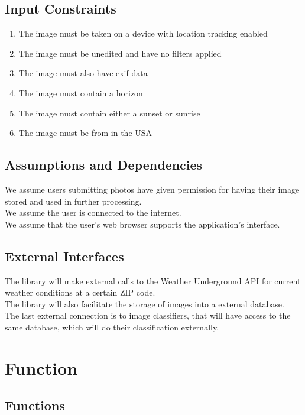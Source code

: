 \documentclass[journal,10pt,draftclsnofoot,onecolumn]{IEEEtran}
\begin{document}
\begin{singlespace}
	\subsection{Input Constraints}
	\begin{enumerate}
		\item The image must be taken on a device with location tracking enabled
		\item The image must be unedited and have no filters applied
		\item The image must also have exif data
		\item The image must contain a horizon
		\item The image must contain either a sunset or sunrise
		\item The image must be from in the USA
	\end{enumerate}

	\subsection{Assumptions and Dependencies}
		We assume users submitting photos have given permission for having their image stored and used in further processing.\\
		We assume the user is connected to the internet.\\
		We assume that the user's web browser supports the application's interface.\\


	\subsection{External Interfaces}
		The library will make external calls to the Weather Underground API for current weather conditions at a certain ZIP code.\\
		The library will also facilitate the storage of images into a external database.\\
		The last external connection is to image classifiers, that will have access to the same database, which will do their classification externally.

\clearpage

\section{Function}
	\subsection{Functions}

\end{singlespace}
\end{document}
